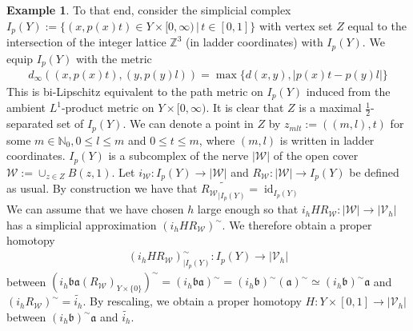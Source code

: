 \documentclass[a4paper,11pt]{article}
\theoremstyle{definition}
\newtheorem{example}[definition]{Example}
\theoremstyle{plain}
\theoremstyle{remark}
\DeclareMathOperator{\id}{id}
\begin{document}
{\begin{example}
To that end, consider the simplicial complex $I_{p}(Y):=\{(x,p(x)t) \in Y \times [0,\infty) \,|\, t\in [0,1]\}$ with vertex set $Z$ equal to the intersection of the integer lattice $\mathbb{Z}^3$ (in ladder coordinates) with $I_{p}(Y)$. We equip $I_{p}(Y)$ with the metric 
\begin{align*}
d_{\infty}((x,p(x)t), (y,p(y)l)) = \max\{d(x,y), |p(x)t-p(y)l|\}
\end{align*}
This is bi-Lipschitz equivalent to the path metric on $I_{p}(Y)$ induced from the ambient $L^1$-product metric on $Y \times [0,\infty)$. It is clear that $Z$ is a maximal $\frac{1}{2}$-separated set of $I_{p}(Y)$.  We can denote a point in $Z$ by $z_{mlt}:= ((m,l),t)$ for some $m\in \mathbb{N}_{0}, 0 \leq l \leq m$ and $0 \leq t \leq m$, where $(m,l)$ is written in ladder coordinates. $I_{p}(Y)$ is a subcomplex of the nerve $|\mathcal{W}|$ of the open cover $\mathcal{W}:=\cup_{z\in Z} B(z,1)$. Let $i_{\mathcal{W}}: I_{p}(Y)\rightarrow |\mathcal{W}|$ and $R_{\mathcal{W}}: |\mathcal{W}|\rightarrow I_{p}(Y)$ be defined as usual. By construction we have that $\widetilde{{R_{\mathcal{W}}}_{|I_{p}(Y)}} = \id_{I_{p}(Y)}$ \\

We can assume that we have chosen $h$ large enough so that $i_{h}HR_{\mathcal{W}}: |\mathcal{W}|\rightarrow |\mathcal{V}_{h}|$ has a simplicial approximation $(i_{h}HR_{\mathcal{W}})^{\sim}$. We therefore obtain a  proper homotopy 
\begin{align*}
(i_{h}HR_{\mathcal{W}})^{\sim}_{| I_{p}(Y)}: I_{p}(Y)\rightarrow |\mathcal{V}_{h}|
\end{align*}
between $(i_{h}\mathfrak{b} \mathfrak{a}(R_{\mathcal{W}})_{Y\times \{0\}})^{\sim} = (i_{h}\mathfrak{b} \mathfrak{a})^{\sim} = (i_{h}\mathfrak{b})^{\sim} (\mathfrak{a})^{\sim} \simeq (i_{h}\mathfrak{b})^{\sim} \mathfrak{a}$ and $(i_{h}R_{\mathcal{W}})^{\sim} = \widetilde{i_{h}}$. By rescaling, we obtain a proper homotopy $H: Y\times [0,1]\rightarrow |\mathcal{V}_{h}|$ between $(i_{h}\mathfrak{b})^{\sim} \mathfrak{a}$ and $ \widetilde{i_{h}}$. \\


\end{example}}
\end{document}
